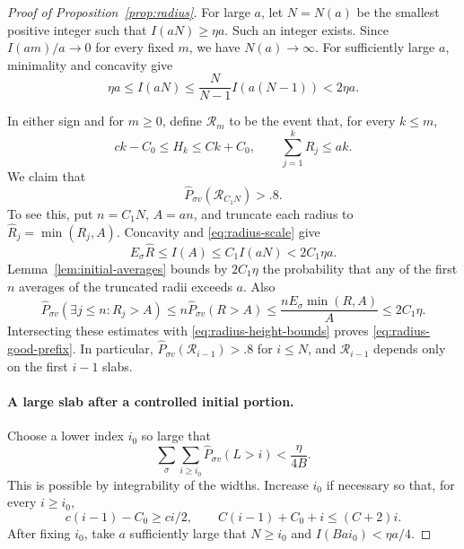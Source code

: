\begin{proof}[Proof of Proposition~\ref{prop:radius}]
For large \(a\), let \(N=N(a)\) be the smallest positive integer
such that \(I(aN)\ge\eta a\).  Such an integer exists.  Since
\(I(am)/a\to0\) for every fixed \(m\), we have \(N(a)\to\infty\).
For sufficiently large \(a\), minimality and concavity give
\begin{equation}\label{eq:radius-scale}
 \eta a\le I(aN)
 \le \frac{N}{N-1}I(a(N-1))<2\eta a.
\end{equation}

In either sign and for \(m\ge0\), define \(\mathcal R_m\) to be the
event that, for every \(k\le m\),
\[
 ck-C_0\le H_k\le Ck+C_0,
 \qquad \sum_{j=1}^kR_j\le ak.
\]
We claim that
\begin{equation}\label{eq:radius-good-prefix}
 \widehat P_{\sigma v}(\mathcal R_{C_1N})>.8.
\end{equation}
To see this, put \(n=C_1N\), \(A=an\), and truncate each radius to
\(\widehat R_j=\min(R_j,A)\).  Concavity and
\eqref{eq:radius-scale} give
\[
 E_\sigma\widehat R\le I(A)\le C_1 I(aN)<2C_1\eta a.
\]
Lemma~\ref{lem:initial-averages} bounds by \(2C_1\eta\) the
probability that any of the first \(n\) averages of the truncated
radii exceeds \(a\).  Also
\[
 \widehat P_{\sigma v}(\exists j\le n:R_j>A)
 \le n\widehat P_{\sigma v}(R>A)
 \le \frac{nE_\sigma\min(R,A)}{A}
 \le2C_1\eta.
\]
Intersecting these estimates with \eqref{eq:radius-height-bounds}
proves \eqref{eq:radius-good-prefix}.  In particular,
\(\widehat P_{\sigma v}(\mathcal R_{i-1})>.8\) for \(i\le N\),
and \(\mathcal R_{i-1}\) depends only on the first \(i-1\) slabs.

\paragraph{A large slab after a controlled initial portion.}
Choose a lower index \(i_0\) so large that
\begin{equation}\label{eq:radius-width-tail}
 \sum_\sigma\sum_{i\ge i_0}\widehat P_{\sigma v}(L>i)
 <\frac{\eta}{4B}.
\end{equation}
This is possible by integrability of the widths.  Increase \(i_0\)
if necessary so that, for every \(i\ge i_0\),
\begin{equation}\label{eq:radius-index-margins}
 c(i-1)-C_0\ge ci/2,
 \qquad C(i-1)+C_0+i\le(C+2)i.
\end{equation}
After fixing \(i_0\), take \(a\) sufficiently large that \(N\ge i_0\)
and \(I(Bai_0)<\eta a/4\).


\end{proof}
